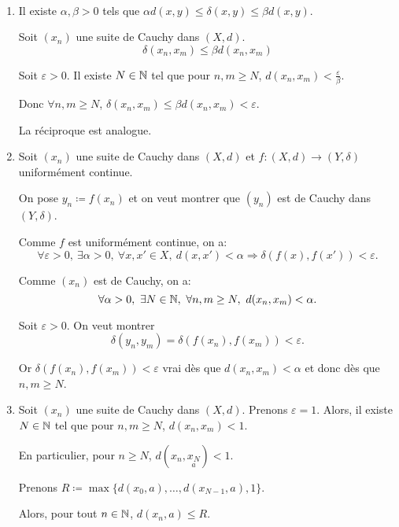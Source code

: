 \documentclass[french,a4paper,10pt]{article}
\begin{document}
    \begin{myproof}\,
        \begin{enumerate}
            \item Il existe $\alpha,\beta>0$ tels que $\alpha d(x,y)\leq \delta(x,y)\leq \beta d(x,y)$.

            Soit $(x_n)$ une suite de Cauchy dans $(X,d)$.
            \[
                \delta(x_n,x_m)\leq \beta d(x_n,x_m)
            \]

            Soit $\varepsilon>0$. Il existe $N\in\mathbb{N}$ tel que pour $n,m\geq N$, $d(x_n,x_m)<\frac{\varepsilon}{\beta}$.

            Donc $\forall n,m\geq N$, $\delta(x_n,x_m)\leq \beta d(x_n,x_m)<\varepsilon$.

            La réciproque est analogue.

            \item Soit $(x_n)$ une suite de Cauchy dans $(X,d)$ et $f\colon (X,d)\to (Y,\delta)$ uniformément continue.

            On pose $y_n\coloneqq f(x_n)$ et on veut montrer que $(y_n)$ est de Cauchy dans $(Y,\delta)$.

            Comme $f$ est uniformément continue, on a:
            \[
                \forall \varepsilon>0,\ \exists \alpha>0,\ \forall x,x'\in X,\ d(x,x')<\alpha\Rightarrow \delta(f(x),f(x'))<\varepsilon.
            \]

            Comme $(x_n)$ est de Cauchy, on a:
            \[
                \forall \alpha>0,\ \exists N\in\bb N,\ \forall n,m\geq N,\ d(x_n,x_m)<\alpha.
            \]

            Soit $\varepsilon>0$. On veut montrer
            \[
                \delta(y_n,y_m)=\delta(f(x_n),f(x_m))<\varepsilon.
            \]

            Or $\delta(f(x_n),f(x_m))<\varepsilon$ vrai dès que $d(x_n,x_m)<\alpha$ et donc dès que $n,m\geq N$.

            \item Soit $(x_n)$ une suite de Cauchy dans $(X,d)$.
            Prenons $\varepsilon=1$. 
            Alors, il existe $N\in\mathbb{N}$ tel que pour $n,m\geq N$, $d(x_n,x_m)<1$.

            En particulier, pour $n\geq N$, $d(x_n,\underset{a}{x_N})<1$.

            Prenons $R\coloneqq \max\{d(x_0,a),\ldots,d(x_{N-1},a),1\}$.

            Alors, pour tout $n\in\mathbb{N}$, $d(x_n,a)\leq R$.


\end{enumerate}
\end{myproof}
\end{document}

